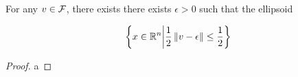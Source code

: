 %             
%             
%             






\begin{lemma}
For any $v \in {\mathcal F}$, there exists there exists $\epsilon > 0$ such that the ellipsoid

\begin{align*}
\left\{x \in \mathbb R^n \bigg | \frac 1 2 \left\| v - \epsilon \right\| \le \frac 1 2 \right\}
\end{align*}

\end{lemma}

\begin{proof}
a
\end{proof}
